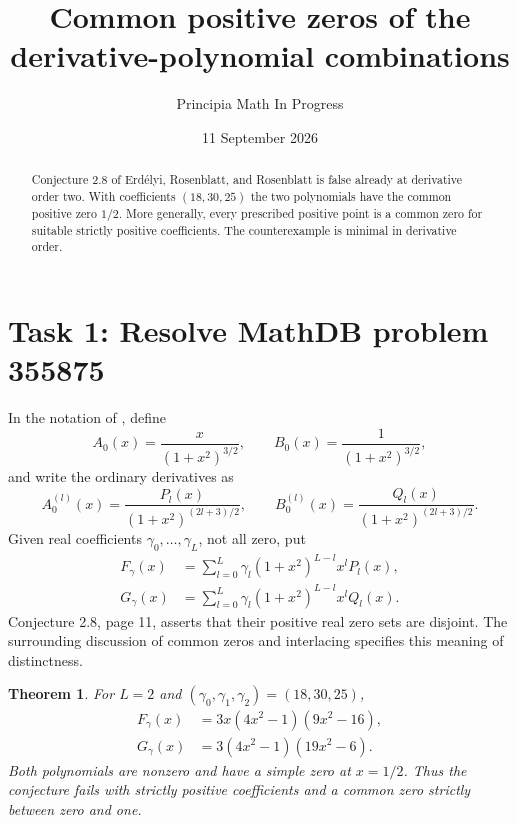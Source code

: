 \documentclass[11pt]{article}
\title{Common positive zeros of the derivative-polynomial combinations}
\author{Principia Math In Progress}
\date{11 September 2026}
\newtheorem{theorem}{Theorem}
\begin{document}
\maketitle
\begin{abstract}
Conjecture 2.8 of Erd\'elyi, Rosenblatt, and Rosenblatt is false already
at derivative order two. With coefficients $(18,30,25)$ the two polynomials
have the common positive zero $1/2$. More generally, every prescribed
positive point is a common zero for suitable strictly positive coefficients.
The counterexample is minimal in derivative order.
\end{abstract}

\section*{Task 1: Resolve MathDB problem 355875}
In the notation of \cite{source}, define
\[
 A_0(x)=\frac{x}{(1+x^2)^{3/2}},\qquad
 B_0(x)=\frac1{(1+x^2)^{3/2}},
\]
and write the ordinary derivatives as
\[
 A_0^{(l)}(x)=\frac{P_l(x)}{(1+x^2)^{(2l+3)/2}},\qquad
 B_0^{(l)}(x)=\frac{Q_l(x)}{(1+x^2)^{(2l+3)/2}}.
\]
Given real coefficients $\gamma_0,\ldots,\gamma_L$, not all zero, put
\begin{align*}
 F_\gamma(x)&=\sum_{l=0}^L
 \gamma_l(1+x^2)^{L-l}x^lP_l(x),\\
 G_\gamma(x)&=\sum_{l=0}^L
 \gamma_l(1+x^2)^{L-l}x^lQ_l(x).
\end{align*}
Conjecture 2.8, page 11, asserts that their positive real zero sets are
disjoint. The surrounding discussion of common zeros and interlacing
specifies this meaning of distinctness.

\begin{theorem}\label{thm:example}
For $L=2$ and $(\gamma_0,\gamma_1,\gamma_2)=(18,30,25)$,
\begin{align}
 F_\gamma(x)&=3x(4x^2-1)(9x^2-16),\label{eq:F}\\
 G_\gamma(x)&=3(4x^2-1)(19x^2-6).\label{eq:G}
\end{align}
Both polynomials are nonzero and have a simple zero at $x=1/2$.
Thus the conjecture fails with strictly positive coefficients and a common
zero strictly between zero and one.
\end{theorem}
\end{document}
